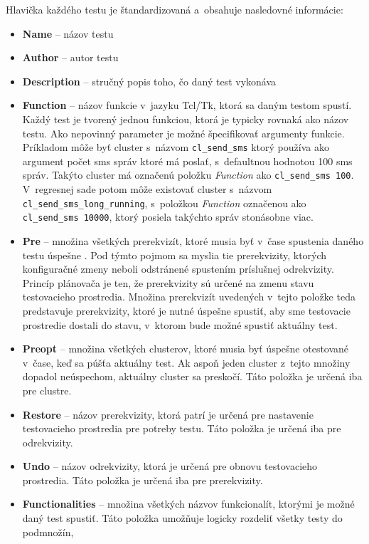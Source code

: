 Hlavička každého testu je štandardizovaná a~obsahuje nasledovné informácie:
\begin{itemize}
\item \textbf{Name} -- názov testu
\item \textbf{Author} -- autor testu
\item \textbf{Description} -- stručný popis toho, čo daný test vykonáva
\item \textbf{Function} -- názov funkcie v~jazyku Tcl/Tk, ktorá sa daným 
testom spustí. Každý test je tvorený jednou funkciou, ktorá je typicky 
rovnaká ako názov testu. Ako nepovinný parameter je možné špecifikovať 
argumenty funkcie. Príkladom môže byť cluster s~názvom 
\texttt{cl\_send\_sms} ktorý používa ako argument počet sms správ ktoré 
má poslať, s~defaultnou hodnotou 100 sms správ.
Takýto cluster má označenú položku \textit{Function} ako \texttt{cl\_send\_sms 100}. 
V~regresnej sade potom môže existovať cluster s~názvom 
\texttt{cl\_send\_sms\_long\_running}, s~položkou \textit{Function}
označenou ako \texttt{cl\_send\_sms 10000}, ktorý 
posiela takýchto správ stonásobne viac.
\item \textbf{Pre} -- množina všetkých prerekvizít, ktoré musia byť 
v~čase spustenia daného testu úspešne . 
Pod týmto pojmom sa myslia tie prerekvizity, ktorých konfiguračné
zmeny neboli odstránené spustením príslušnej odrekvizity.
Princíp plánovača je ten, že prerekvizity sú určené na zmenu stavu 
testovacieho prostredia. Množina prerekvizít uvedených v~tejto položke 
teda predstavuje prerekvizity, ktoré je nutné úspešne spustiť, aby sme 
testovacie prostredie dostali do stavu, v~ktorom bude možné spustiť 
aktuálny test.
\item \textbf{Preopt} -- množina všetkých clusterov, ktoré musia byť 
úspešne otestované v~čase, keď sa púšťa aktuálny test. 
Ak aspoň jeden cluster z~tejto množiny dopadol neúspechom, aktuálny 
cluster sa preskočí. Táto položka je určená iba pre clustre.
\item \textbf{Restore} -- názov prerekvizity, ktorá patrí je určená pre 
nastavenie testovacieho prostredia pre potreby testu. 
Táto položka je určená iba pre odrekvizity.
\item \textbf{Undo} -- názov odrekvizity, ktorá je určená pre obnovu 
testovacieho prostredia. Táto položka je určená iba pre prerekvizity. 
\item \textbf{Functionalities} -- množina všetkých názvov funkcionalít, 
ktorými je možné daný test spustiť. 
Táto položka umožňuje logicky rozdeliť všetky testy do podmnožín, 

\end{itemize}
